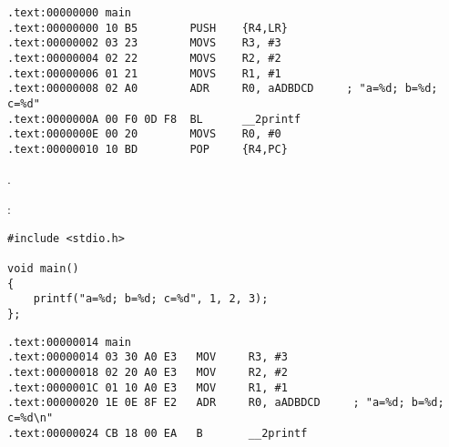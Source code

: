 \myparagraph{\OptimizingKeilVI (\ThumbMode)}

\begin{lstlisting}[caption=\OptimizingKeilVI (\ThumbMode)]
.text:00000000 main
.text:00000000 10 B5        PUSH    {R4,LR}
.text:00000002 03 23        MOVS    R3, #3
.text:00000004 02 22        MOVS    R2, #2
.text:00000006 01 21        MOVS    R1, #1
.text:00000008 02 A0        ADR     R0, aADBDCD     ; "a=%d; b=%d; c=%d"
.text:0000000A 00 F0 0D F8  BL      __2printf
.text:0000000E 00 20        MOVS    R0, #0
.text:00000010 10 BD        POP     {R4,PC}
\end{lstlisting}

.

\label{ARM_B_to_printf}

 :

\begin{lstlisting}
#include <stdio.h>

void main()
{
	printf("a=%d; b=%d; c=%d", 1, 2, 3);
};
\end{lstlisting}


\begin{lstlisting}[caption=\OptimizingKeilVI (\ARMMode)]
.text:00000014 main
.text:00000014 03 30 A0 E3   MOV     R3, #3
.text:00000018 02 20 A0 E3   MOV     R2, #2
.text:0000001C 01 10 A0 E3   MOV     R1, #1
.text:00000020 1E 0E 8F E2   ADR     R0, aADBDCD     ; "a=%d; b=%d; c=%d\n"
.text:00000024 CB 18 00 EA   B       __2printf
\end{lstlisting}

